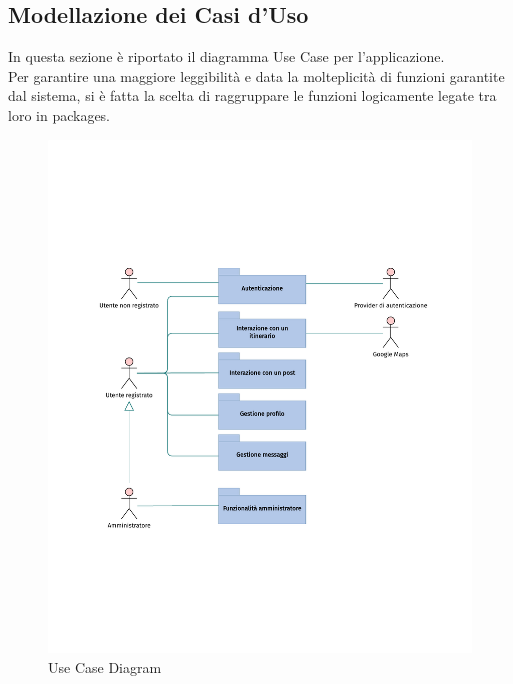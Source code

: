 \documentclass{natourDoc}
\begin{document}
\newpage

\newpage
\subsection{Modellazione dei Casi d'Uso}
In questa sezione è riportato il diagramma Use Case per l'applicazione.\\
Per garantire una maggiore leggibilità e data la molteplicità di funzioni garantite
dal sistema, si è fatta la scelta di raggruppare le funzioni logicamente legate
tra loro in packages.

\begin{figure}[!htbp]
	\centering
	\includegraphics[width=\textwidth, page=1]{./diagrams/useCase.pdf}
	\caption{Use Case Diagram}
\end{figure}
\FloatBarrier

\newpage
\end{document}
